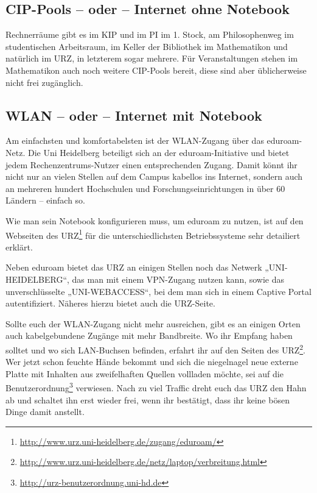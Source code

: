 \subsection*{CIP-Pools -- oder -- Internet ohne Notebook}
Rechnerräume gibt es im \gls{KIP} und im \gls{PI} im 1. Stock, am Philosophenweg im studentischen Arbeitsraum, im Keller der Bibliothek im \gls{Mathematikon} und natürlich im \gls{URZ}, in letzterem sogar mehrere. Für Veranstaltungen stehen im Mathematikon auch noch weitere CIP-Pools bereit, diese sind aber üblicherweise nicht frei zugänglich.

\subsection*{WLAN -- oder -- Internet mit Notebook}
Am einfachsten und komfortabelsten ist der WLAN-Zugang über das e\-du\-roam-Netz. Die Uni Heidelberg beteiligt sich an der eduroam-Initiative und bietet jedem Rechenzentrums-Nutzer einen entsprechenden Zugang. Damit könnt ihr nicht nur an vielen Stellen auf dem Campus kabellos ins Internet, sondern auch an mehreren hundert Hochschulen und Forschungseinrichtungen in über 60 Ländern – einfach so.

Wie man sein Notebook konfigurieren muss, um eduroam zu nutzen, ist auf den Webseiten des URZ\footnote{\url{http://www.urz.uni-heidelberg.de/zugang/eduroam/}} für die unterschiedlichsten Betriebssysteme sehr detailiert erklärt.

Neben eduroam bietet das URZ an einigen Stellen noch das Netwerk „UNI-HEIDELBERG“, das man mit einem VPN-Zugang nutzen kann, sowie das unverschlüsselte „UNI-WEBACCESS“, bei dem man sich in einem Captive Portal autentifiziert. Näheres hierzu bietet auch die URZ-Seite.%

Sollte euch der WLAN-Zugang nicht mehr ausreichen, gibt es an einigen Orten auch kabelgebundene Zugänge mit mehr Bandbreite. Wo ihr Empfang haben solltet und wo sich LAN-Buchsen befinden, erfahrt ihr auf den Seiten des \gls{URZ}\footnote{\url{http://www.urz.uni-heidelberg.de/netz/laptop/verbreitung.html}}. Wer jetzt schon feuchte Hände bekommt und sich die niegelnagel neue externe Platte mit Inhalten aus zweifelhaften Quellen vollladen möchte, sei auf die Benutzerordnung\footnote{\url{http://urz-benutzerordnung.uni-hd.de}} verwiesen. Nach zu viel Traffic dreht euch das \gls{URZ} den Hahn ab und schaltet ihn erst wieder frei, wenn ihr bestätigt, dass ihr keine bösen Dinge damit anstellt.

